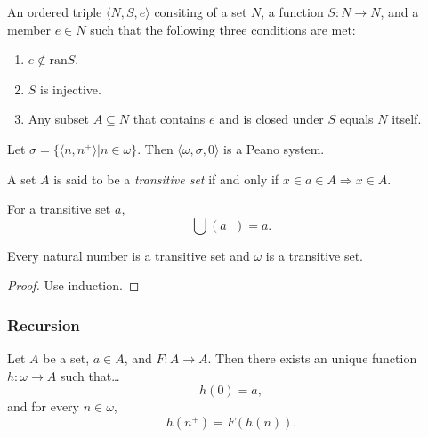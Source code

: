 \label{peanosystem}
An ordered triple $\langle N, S, e \rangle$ consiting of a set $N$, a function $S: N \rightarrow N$, and a member $e \in N$ such that the following three conditions are met:
\begin{enumerate}
  \item $e \not\in \textrm{ran} S$.
  \item $S$ is injective.
  \item Any subset $A \subseteq N$ that contains $e$ and is closed under $S$ equals $N$ itself.
\end{enumerate}

\begin{proposition}
Let $\sigma = \{\langle n, n^+ \rangle | n \in \omega\}$. Then $\langle \omega, \sigma, 0 \rangle$ is a Peano system.
\end{proposition}

\label{transitiveset}
A set $A$ is said to be a \emph{transitive set} if and only if $x \in a \in A \Rightarrow x \in A$.

\begin{proposition}
For a transitive set $a$,
$$\bigcup(a^+) = a.$$
\end{proposition}

\begin{proposition}
Every natural number is a transitive set and $\omega$ is a transitive set.
\end{proposition}

\begin{proof}
Use induction.
\end{proof}

\subsubsection{Recursion}\label{recursion}

\begin{theorem}
Let $A$ be a set, $a \in A$, and $F: A \rightarrow A.$ Then there exists an unique function $h: \omega \rightarrow A$ such that\dots
$$h(0) = a,$$
and for every $n \in \omega$,
$$h(n^+) = F(h(n)).$$
\end{theorem}

